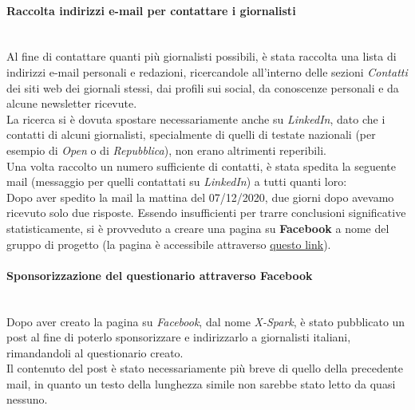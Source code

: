 \paragraph{Raccolta indirizzi e-mail per contattare i giornalisti}{}\mbox{}\\
Al fine di contattare quanti più giornalisti possibili, è stata raccolta una lista di indirizzi e-mail personali e redazioni, ricercandole all'interno delle sezioni \textit{Contatti} dei siti web dei giornali stessi, dai profili sui social, da conoscenze personali e da alcune newsletter ricevute.\\
La ricerca si è dovuta spostare necessariamente anche su \textit{LinkedIn}, dato che i contatti di alcuni giornalisti, specialmente di quelli di testate nazionali (per esempio di \textit{Open} o di \textit{Repubblica}), non erano altrimenti reperibili.\\
Una volta raccolto un numero sufficiente di contatti, è stata spedita la seguente mail (messaggio per quelli contattati su \textit{LinkedIn}) a tutti quanti loro:\\

Dopo aver spedito la mail la mattina del 07/12/2020, due giorni dopo avevamo ricevuto solo due risposte.
Essendo insufficienti per trarre conclusioni significative statisticamente, si è provveduto a creare una pagina su \textbf{Facebook} a nome del gruppo di progetto (la pagina è accessibile attraverso \href{https://www.facebook.com/XSparkUnibo}{questo link}).

\paragraph{Sponsorizzazione del questionario attraverso Facebook}\mbox{}\\
Dopo aver creato la pagina su \textit{Facebook}, dal nome \textit{X-Spark}, è stato pubblicato un post al fine di poterlo sponsorizzare e indirizzarlo a giornalisti italiani, rimandandoli al questionario creato.\\
Il contenuto del post è stato necessariamente più breve di quello della precedente mail, in quanto un testo della lunghezza simile non sarebbe stato letto da quasi nessuno.

